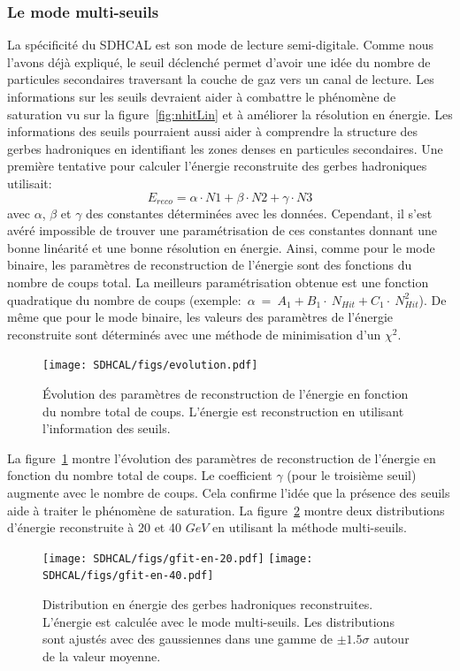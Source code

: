 \subsubsection{Le mode multi-seuils}
La spécificité du SDHCAL est son mode de lecture semi-digitale. Comme nous l'avons déjà expliqué, le seuil déclenché permet d'avoir une idée du nombre de particules secondaires traversant la couche de gaz vers un canal de lecture. Les informations sur les seuils devraient aider à combattre le phénomène de saturation vu sur la figure~\ref{fig:nhitLin} et à améliorer la résolution en énergie. Les informations des seuils pourraient aussi aider à comprendre la structure des gerbes hadroniques en identifiant les zones denses en particules secondaires. Une première tentative pour calculer l'énergie reconstruite des gerbes hadroniques utilisait:
\begin{equation}
  E_{reco}=\alpha\cdot N1+\beta\cdot N2+\gamma\cdot N3
  \label{eq.erec}
\end{equation}
avec $\alpha$, $\beta$ et $\gamma$ des constantes déterminées avec les données. Cependant, il s'est avéré impossible de trouver une paramétrisation de ces constantes donnant une bonne linéarité et une bonne résolution en énergie. Ainsi, comme pour le mode binaire, les paramètres de reconstruction de l'énergie sont des fonctions du nombre de coups total. La meilleurs paramétrisation obtenue est une fonction quadratique du nombre de coups (exemple:~$\alpha~=~A_1+B_1\cdot~N_{Hit}+C_1\cdot~N_{Hit}^2$). De même que pour le mode binaire, les valeurs des paramètres de l'énergie reconstruite sont déterminés avec une méthode de minimisation d'un $\chi^2$. 
\begin{figure}[!h]
  \begin{center}
    \texttt{[image: SDHCAL/figs/evolution.pdf]}
    \caption{Évolution des paramètres de reconstruction de l'énergie en fonction du nombre total de coups. L'énergie est reconstruction en utilisant l'information des seuils.}
    \label{fig:evol}
  \end{center}
\end{figure}
La figure~\ref{fig:evol} montre l'évolution des paramètres de reconstruction de l'énergie en fonction du nombre total de coups. Le coefficient $\gamma$ (pour le troisième seuil) augmente avec le nombre de coups. Cela confirme l'idée que la présence des seuils aide à traiter le phénomène de saturation. La figure~\ref{fig:energy_dist_sd} montre deux distributions d'énergie reconstruite à 20 et 40 $GeV$ en utilisant la méthode multi-seuils. 
\begin{figure}[!h]
  \begin{center}
    \texttt{[image: SDHCAL/figs/gfit-en-20.pdf]}
    \texttt{[image: SDHCAL/figs/gfit-en-40.pdf]}
    \caption{Distribution en énergie des gerbes hadroniques reconstruites. L'énergie est calculée avec le mode multi-seuils. Les distributions sont ajustés avec des gaussiennes dans une gamme de $\pm1.5\sigma$ autour de la valeur moyenne.}
    \label{fig:energy_dist_sd}
  \end{center}
\end{figure}

